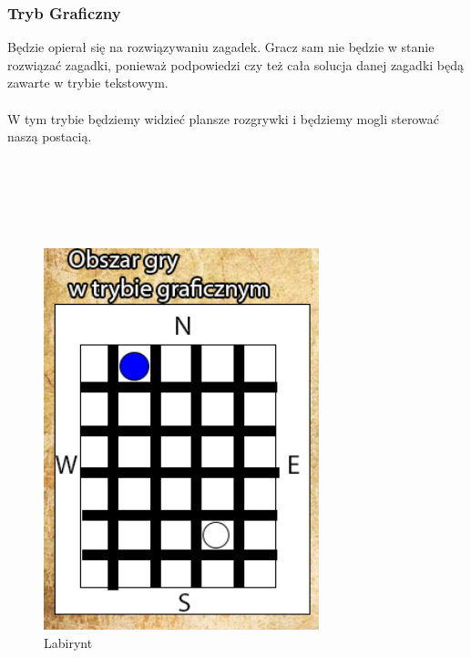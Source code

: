 \subsubsection{Tryb Graficzny}
\hspace{0.60cm}Będzie opierał się na rozwiązywaniu zagadek. Gracz sam nie będzie w stanie rozwiązać zagadki, ponieważ podpowiedzi czy też cała solucja danej zagadki będą zawarte w trybie tekstowym.
\\
\\
W tym trybie będziemy widzieć plansze rozgrywki i będziemy mogli sterować naszą postacią.
\\
\\
\\
\\
\\
\\
	\begin{figure}[!htb]
	\begin{center}
		\includegraphics[width=8cm]{rys/gra2.png}
		\caption{Labirynt}
		\label{rys:rysunek001}
	\end{center}
\end{figure}

